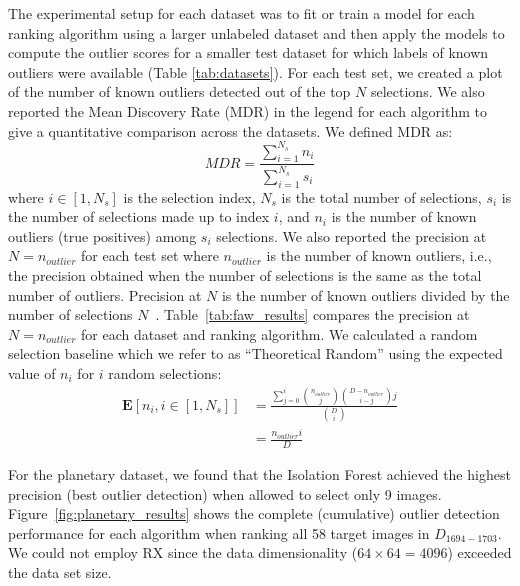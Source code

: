 \documentclass[utf8]{frontiersFPHY} %
\newcommand{\todo}[1]{\textcolor{blue}{#1}}
\begin{document}
The experimental setup for each dataset was to fit or train a model for
each ranking algorithm using a larger unlabeled dataset and then apply 
the models to compute the outlier scores for a smaller test dataset for which
labels of known outliers were available (Table \ref{tab:datasets}). 
For each test set, we created a plot of the number of known outliers 
detected out of the top $N$ selections. We also 
reported the Mean Discovery Rate (MDR) in the legend
for each algorithm to give a quantitative comparison across the datasets. We defined MDR as:
\begin{equation}
MDR = \frac{\sum^{N_s}_{i=1} n_i}{\sum^{N_s}_{i=1} s_i}
\end{equation}
where $i \in [1, N_s]$ is the selection index,
$N_s$ is the total number of selections,
$s_i$ is the number of selections made up to index $i$,
and $n_i$ is the number of known outliers (true positives)
among $s_i$ selections.
We also reported the precision at $N=n_{outlier}$ for each test set where
$n_{outlier}$ is the number of known outliers, i.e.,  the precision obtained 
when the number of selections is the same as the total number of outliers. 
Precision at $N$ is the number of known outliers divided by the number of 
selections $N$~\citep{campos2016evaluation}.
Table~\ref{tab:faw_results} compares the precision at $N=n_{outlier}$ for
each dataset and ranking algorithm. 
We calculated a random selection baseline which we refer to as ``Theoretical
Random'' using the expected value of $n_i$ for $i$ random selections:
\begin{align}
\mathbf{E}[n_i, i \in[1, N_s]] &= \frac{\sum^i_{j=0} {n_{outlier}\choose j} {D-n_{outlier}\choose i-j} j}{{D\choose i}} \\
&= \frac{n_{outlier}i}{D}
\end{align}

%

For the planetary dataset, we found that
the Isolation Forest achieved the highest precision (best outlier
detection) when allowed to select only \num{9} images.
Figure~\ref{fig:planetary_results} shows the complete (cumulative)
outlier detection performance for each algorithm when ranking
all \num{58} target images in $D_{1694-1703}$. We could not
employ RX since the data dimensionality ($64 \times 64 =
4096$) exceeded the data set size. 
\end{document}
